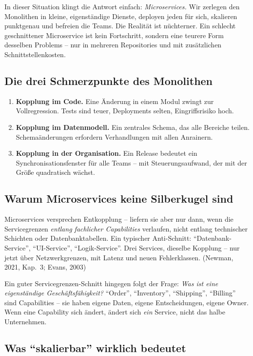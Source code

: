 \documentclass[11pt,a4paper,oneside]{article}
\newcommand{\fachbegriff}[1]{\textbf{#1}}
\newcommand{\quelle}[1]{{\footnotesize\color{lpGray}(#1)}}
\begin{document}
In dieser Situation klingt die Antwort einfach: \emph{Microservices.} Wir zerlegen den Monolithen in kleine, eigenständige Dienste, deployen jeden für sich, skalieren punktgenau und befreien die Teams. Die Realität ist nüchterner. Ein schlecht geschnittener Microservice ist kein Fortschritt, sondern eine teurere Form desselben Problems -- nur in mehreren Repositories und mit zusätzlichen Schnittstellenkosten.

\subsection{Die drei Schmerzpunkte des Monolithen}

\begin{enumerate}
  \item \fachbegriff{Kopplung im Code.} Eine Änderung in einem Modul zwingt zur Vollregression. Tests sind teuer, Deployments selten, Eingriffsrisiko hoch.
  \item \fachbegriff{Kopplung im Datenmodell.} Ein zentrales Schema, das alle Bereiche teilen. Schemaänderungen erfordern Verhandlungen mit allen Anrainern.
  \item \fachbegriff{Kopplung in der Organisation.} Ein Release bedeutet ein Synchronisationsfenster für alle Teams -- mit Steuerungsaufwand, der mit der Größe quadratisch wächst.
\end{enumerate}

\subsection{Warum Microservices keine Silberkugel sind}

Microservices versprechen Entkopplung -- liefern sie aber nur dann, wenn die Servicegrenzen \emph{entlang fachlicher Capabilities} verlaufen, nicht entlang technischer Schichten oder Datenbanktabellen. Ein typischer Anti-Schnitt: ``Datenbank-Service'', ``UI-Service'', ``Logik-Service''. Drei Services, dieselbe Kopplung -- nur jetzt über Netzwerkgrenzen, mit Latenz und neuen Fehlerklassen. \quelle{Newman, 2021, Kap.~3; Evans, 2003}

Ein guter Servicegrenzen-Schnitt hingegen folgt der Frage: \emph{Was ist eine eigenständige Geschäftsfähigkeit?} ``Order'', ``Inventory'', ``Shipping'', ``Billing'' sind Capabilities -- sie haben eigene Daten, eigene Entscheidungen, eigene Owner. Wenn eine Capability sich ändert, ändert sich \emph{ein} Service, nicht das halbe Unternehmen.

\subsection{Was ``skalierbar'' wirklich bedeutet}
\end{document}
